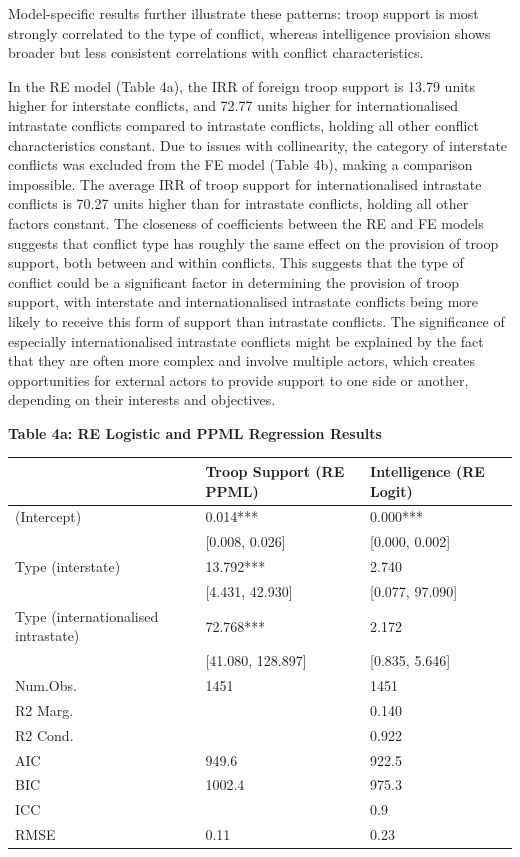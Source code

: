 \documentclass[
]{article}
\begin{document}
Model-specific results further illustrate these patterns: troop support
is most strongly correlated to the type of conflict, whereas
intelligence provision shows broader but less consistent correlations
with conflict characteristics.

In the RE model (Table 4a), the IRR of foreign troop support is 13.79
units higher for interstate conflicts, and 72.77 units higher for
internationalised intrastate conflicts compared to intrastate conflicts,
holding all other conflict characteristics constant. Due to issues with
collinearity, the category of interstate conflicts was excluded from the
FE model (Table 4b), making a comparison impossible. The average IRR of
troop support for internationalised intrastate conflicts is 70.27 units
higher than for intrastate conflicts, holding all other factors
constant. The closeness of coefficients between the RE and FE models
suggests that conflict type has roughly the same effect on the provision
of troop support, both between and within conflicts. This suggests that
the type of conflict could be a significant factor in determining the
provision of troop support, with interstate and internationalised
intrastate conflicts being more likely to receive this form of support
than intrastate conflicts. The significance of especially
internationalised intrastate conflicts might be explained by the fact
that they are often more complex and involve multiple actors, which
creates opportunities for external actors to provide support to one side
or another, depending on their interests and objectives.

\newpage

\noindent\textbf{Table 4a: RE Logistic and PPML Regression Results}

\begin{tabular}{lll}
\hline
& Troop Support (RE PPML) & Intelligence (RE Logit) \\ \hline
(Intercept) & \num{0.014}*** & \num{0.000}*** \\
& [\num{0.008}, \num{0.026}] & [\num{0.000}, \num{0.002}] \\
Type (interstate) & \num{13.792}*** & \num{2.740} \\
& [\num{4.431}, \num{42.930}] & [\num{0.077}, \num{97.090}] \\
Type (internationalised intrastate) & \num{72.768}*** & \num{2.172} \\
& [\num{41.080}, \num{128.897}] & [\num{0.835}, \num{5.646}] \\
Num.Obs. & \num{1451} & \num{1451} \\
R2 Marg. &  & \num{0.140} \\
R2 Cond. &  & \num{0.922} \\
AIC & \num{949.6} & \num{922.5} \\
BIC & \num{1002.4} & \num{975.3} \\
ICC &  & \num{0.9} \\
RMSE & \num{0.11} & \num{0.23} \\
\hline
\end{tabular}
\end{document}
